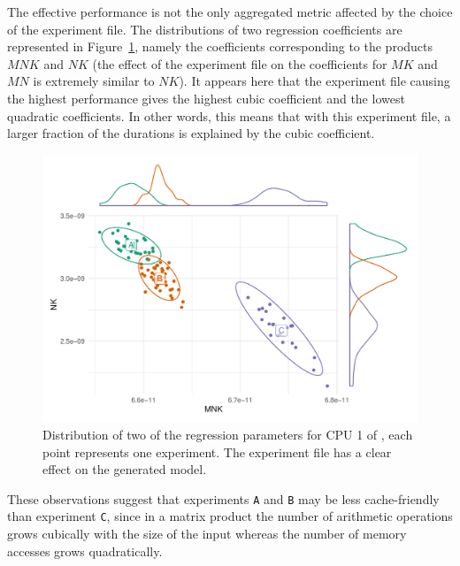             The effective performance is not the only aggregated metric affected by the choice of the experiment file.
            The distributions of two regression coefficients are represented in
            Figure~\ref{fig:randomizing_sizes:expfile:average_distribution}, namely the coefficients corresponding to
            the products \(MNK\) and \(NK\) (the effect of the experiment file on the coefficients for \(MK\) and \(MN\)
            is extremely similar to \(NK\)). It appears here that the experiment file causing the highest performance
            gives the highest cubic coefficient and the lowest quadratic coefficients. In other words, this means that
            with this experiment file, a larger fraction of the \dgemm durations is explained by the cubic coefficient.

            \begin{figure}[tpb]
                \centering
                \includegraphics[width=\linewidth]{img/experiment/randomizing_sizes/expfile/average_distribution.pdf}
                \caption{Distribution of two of the regression parameters for CPU 1 of \dahu[5], each point represents one
                experiment. The experiment file has a clear effect on the generated model.}%
                \label{fig:randomizing_sizes:expfile:average_distribution}
            \end{figure}

            These observations suggest that experiments \texttt{A} and \texttt{B} may be less cache-friendly than
            experiment \texttt{C}, since in a matrix product the number of arithmetic operations grows cubically with
            the size of the input whereas the number of memory accesses grows quadratically.

